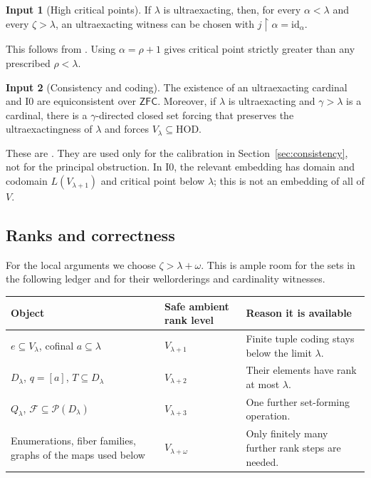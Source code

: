 \documentclass[11pt,letterpaper]{article}
\theoremstyle{definition}
\newtheorem{inputthm}{Input}
\numberwithin{equation}{section}
\newcommand{\ZFC}{\mathsf{ZFC}}
\newcommand{\HOD}{\mathrm{HOD}}
\newcommand{\Pow}{\mathcal P}
\newcommand{\id}{\mathrm{id}}
\newcommand{\restr}{\mathbin{\upharpoonright}}
\newcommand{\Izero}{\mathrm{I0}}
\newcommand{\FF}{\mathcal F}
\begin{document}
\begin{inputthm}[High critical points]\label{in:highcrit}
If $\lambda$ is ultraexacting, then, for every $\alpha<\lambda$ and every $\zeta>\lambda$, an ultraexacting witness can be chosen with $j\restr\alpha=\id_\alpha$.
\end{inputthm}

This follows from \cite[Lemma 3.2(iii), with the auxiliary parameter empty]{ABL}. Using $\alpha=\rho+1$ gives critical point strictly greater than any prescribed $\rho<\lambda$.

\begin{inputthm}[Consistency and coding]\label{in:consistency}
The existence of an ultraexacting cardinal and $\Izero$ are equiconsistent over $\ZFC$. Moreover, if $\lambda$ is ultraexacting and $\gamma>\lambda$ is a cardinal, there is a $\gamma$-directed closed set forcing that preserves the ultraexactingness of $\lambda$ and forces $V_\lambda\subseteq\HOD$.
\end{inputthm}

These are \cite[Theorem A and Proposition 3.9]{ABGL}. They are used only for the calibration in Section~\ref{sec:consistency}, not for the principal obstruction. In $\Izero$, the relevant embedding has domain and codomain $L(V_{\lambda+1})$ and critical point below $\lambda$; this is not an embedding of all of $V$.

\subsection{Ranks and correctness}

For the local arguments we choose $\zeta>\lambda+\omega$. This is ample room for the sets in the following ledger and for their wellorderings and cardinality witnesses.

\begin{center}
\small
\renewcommand{\arraystretch}{1.18}
\begin{tabularx}{\textwidth}{@{}P{.36\textwidth}P{.22\textwidth}Y@{}}
\toprule
\textbf{Object}&\textbf{Safe ambient rank level}&\textbf{Reason it is available}\\\midrule
$e\subseteq V_\lambda$, cofinal $a\subseteq\lambda$&$V_{\lambda+1}$&Finite tuple coding stays below the limit $\lambda$.\\
$D_\lambda$, $q=[a]$, $T\subseteq D_\lambda$&$V_{\lambda+2}$&Their elements have rank at most $\lambda$.\\
$Q_\lambda$, $\FF\subseteq\Pow(D_\lambda)$&$V_{\lambda+3}$&One further set-forming operation.\\
Enumerations, fiber families, graphs of the maps used below&$V_{\lambda+\omega}$&Only finitely many further rank steps are needed.\\
\bottomrule
\end{tabularx}
\end{center}
\end{document}

